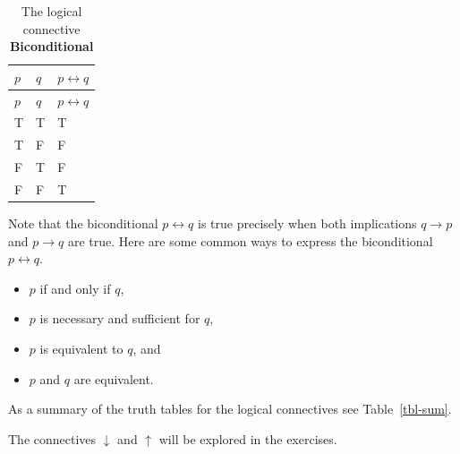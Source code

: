 \documentclass[
  letterpaper,
  10pt,
  reqno,
  twopage,
  openany]{book}
\providecommand{\tightlist}{%
  \setlength{\itemsep}{0pt}\setlength{\parskip}{0pt}}\usepackage{longtable,booktabs,array}
\theoremstyle{plain}
\theoremstyle{definition}
\theoremstyle{definition}
\theoremstyle{definition}
\theoremstyle{plain}
\theoremstyle{plain}
\theoremstyle{remark}
\begin{document}
\hypertarget{tbl-biconditional}{}
\begin{longtable}[]{@{}lll@{}}
\caption{\label{tbl-biconditional}The logical connective
\textbf{Biconditional}}\tabularnewline
\toprule()
\(p\) & \(q\) & \(p\leftrightarrow q\) \\
\midrule()
\endfirsthead
\toprule()
\(p\) & \(q\) & \(p\leftrightarrow q\) \\
\midrule()
\endhead
T & T & T \\
T & F & F \\
F & T & F \\
F & F & T \\
\bottomrule()
\end{longtable}

Note that the biconditional \(p\leftrightarrow q\) is true precisely
when both implications \(q\rightarrow p\) and \(p\rightarrow q\) are
true. Here are some common ways to express the biconditional
\(p\leftrightarrow q\).

\begin{itemize}
\tightlist
\item
  \(p\) if and only if \(q\),
\item
  \(p\) is necessary and sufficient for \(q\),
\item
  \(p\) is equivalent to \(q\), and
\item
  \(p\) and \(q\) are equivalent.
\end{itemize}

As a summary of the truth tables for the logical connectives see
Table~\ref{tbl-sum}.

The connectives \(\downarrow\) and \(\uparrow\) will be explored in the
exercises.
\end{document}
